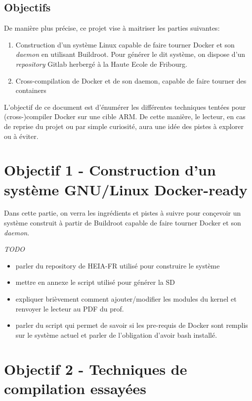 \documentclass[11pt,a4paper,oneside]{report}
\begin{document}
\section{Objectifs}

De manière plus précise, ce projet vise à maitriser les parties suivantes:

\begin{enumerate}
  \item Construction d'un système Linux capable de faire tourner Docker et son \emph{daemon} en utilisant Buildroot. Pour générer le dit système, on dispose d'un \emph{repository} Gitlab herbergé à la Haute Ecole de Fribourg.

  \item Cross-compilation de Docker et de son daemon, capable de faire tourner des containers
\end{enumerate}

L'objectif de ce document est d'énumérer les différentes techniques tentées pour (cross-)compiler Docker sur une cible ARM. De cette manière, le lecteur, en cas de reprise du projet ou par simple curiosité, aura une idée des pistes à explorer ou à éviter.



\chapter{Objectif 1 - Construction d'un système GNU/Linux Docker-ready}

Dans cette partie, on verra les ingrédients et pistes à suivre pour conçevoir un système construit à partir de Buildroot capable de faire tourner Docker et son \emph{daemon}.


\emph{TODO}

\begin{itemize}
  \item{parler du repository de HEIA-FR utilisé pour construire le système}
  \item{mettre en annexe le script utilisé pour générer la SD}
  \item{expliquer brièvement comment ajouter/modifier les modules du kernel et  renvoyer le lecteur au PDF du prof.}
    \item{parler du script qui permet de savoir si les pre-requis de Docker sont remplis sur le système actuel et parler de l'obligation d'avoir bash installé.}
\end{itemize}




\chapter{Objectif 2 - Techniques de compilation essayées}
\end{document}
